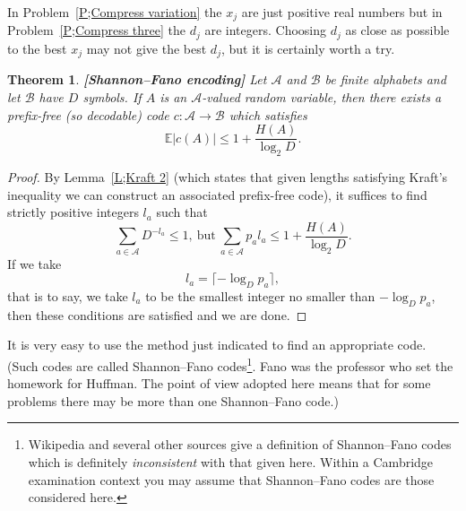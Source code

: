 \documentclass[12pt,a4paper]{article}
\theoremstyle{plain}
\newtheorem{theorem}{Theorem}[section]
\theoremstyle{definition}
\begin{document}
    In Problem~\ref{P;Compress variation}
    the $x_{j}$ are just positive real numbers but in
    Problem~\ref{P;Compress three} the $d_{j}$ are integers.
    Choosing $d_{j}$ as close as possible to the best $x_{j}$
    may not give the best $d_{j}$, but it is certainly worth a try.
    \begin{theorem}
        \label{T;Shannon--Fano}{\bf[Shannon--Fano encoding]}
        Let ${\mathcal A}$ and ${\mathcal B}$
        be finite alphabets and let ${\mathcal B}$ have $D$ symbols. If
        $A$ is an ${\mathcal A}$-valued random variable,
        then there exists
        a prefix-free (so decodable) code
        $c:{\mathcal A}\rightarrow{\mathcal B}$
        which satisfies
        \[{\mathbb E}|c(A)|\leq 1+\frac{H(A)}{\log_{2} D}.\]
    \end{theorem}
    \begin{proof}
        By Lemma~\ref{L;Kraft 2} (which states
        that given lengths satisfying
        Kraft's inequality we can construct an associated
        prefix-free code), it suffices to find strictly
        positive integers $l_{a}$ such that
        \[\sum_{a\in {\mathcal A}}D^{-l_{a}}\leq 1,
        \ \text{but}
        \ \sum_{a\in {\mathcal A}}p_{a}l_{a}\leq 1+\frac{H(A)}{\log_{2} D}.\]
        If we take
        \[l_{a}=\lceil -\log_{D} p_{a}\rceil,\]
        that is to say, we take $l_{a}$ to be the smallest integer
        no smaller than $-\log_{D} p_{a}$, then these conditions
        are satisfied and we are done.
    \end{proof}
    It is very easy to use the method just indicated to
    find an appropriate code. (Such codes are called Shannon--Fano
    codes\footnote{Wikipedia and several other sources give
    a definition of Shannon--Fano codes which is
    definitely \emph{inconsistent} with that given here.
    Within a Cambridge examination context you may assume
    that Shannon--Fano codes are those considered here.}.
    Fano was the professor who set the homework for Huffman.
    The point of view adopted here means that for some
    problems there may be more than one Shannon--Fano
    code.)
\end{document}
